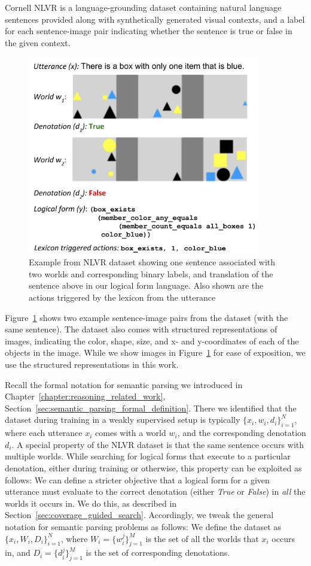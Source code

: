 Cornell NLVR is a language-grounding dataset containing natural language
sentences provided along with synthetically generated visual contexts, and a
label for each sentence-image pair indicating whether the sentence is true or
false in the given context.
\begin{figure} \centering
	\includegraphics[width=4in]{figures/nlvr_example_with_worlds_and_lf.png}
	\caption{Example
	from NLVR dataset showing one sentence associated with two worlds and
	corresponding binary labels, and translation of the sentence above in
	our logical form language. Also shown are the actions triggered by the lexicon from the utterance} \label{fig:nlvr_example_with_two_worlds} 
\end{figure}
Figure~\ref{fig:nlvr_example_with_two_worlds} shows two example sentence-image pairs
from the dataset (with the same sentence). The dataset also comes with
structured representations of images, indicating the color, shape, size,
and x- and y-coordinates of each of the objects in the image. While we
show images in Figure~\ref{fig:nlvr_example_with_two_worlds} for ease of exposition, we
use the structured representations in this work.

Recall the formal notation for semantic parsing we introduced in
Chapter~\ref{chapter:reasoning_related_work},
Section~\ref{sec:semantic_parsing_formal_definition}. There we identified that
the dataset during training in a weakly supervised setup is typically $\{x_i,
w_i, d_i\}_{i=1}^N$, where
each utterance $x_i$ comes with a world $w_i$, and the corresponding denotation
$d_i$. 
A special property of the NLVR dataset is that the same sentence occurs with
multiple worlds. While searching for logical forms that execute to a particular
denotation, either during training or otherwise, this property can be exploited
as follows: We can define a stricter objective that a logical form for a given
utterance must evaluate to the correct denotation (either \textit{True} or
\textit{False}) in \emph{all} the worlds it occurs in. We do this, as described
in Section~\ref{sec:coverage_guided_search}. Accordingly, we tweak the general
notation for semantic parsing problems as follows: We define the dataset as
$\{x_i, W_i, D_i\}_{i=1}^N$, where $W_i = \{w_i^j\}_{j=1}^M$ is the set of all
the worlds that $x_i$ occurs in, and $D_i = \{d_i^j\}_{j=1}^M$ is the set of
corresponding denotations.

